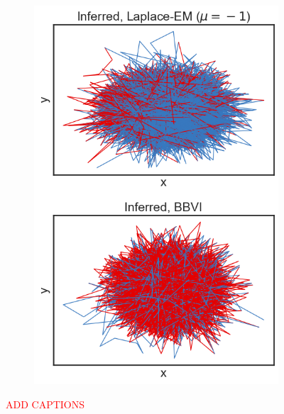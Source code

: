 \begin{figure}
\begin{subfigure}[b]{0.33\linewidth}
        \includegraphics[width=\linewidth]{./Figures/vdp-bad-mu-1.png}
        \caption{}
        \label{badvdp:c}
        \vspace{4ex}
    \end{subfigure}
    \caption{\textcolor{red}{ADD CAPTIONS}}
    \label{badvdp}
\end{figure}

